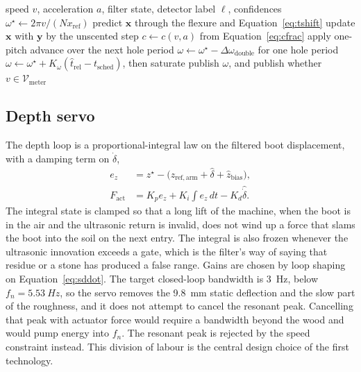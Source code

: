 \begin{algorithm}[ht]
\caption{Plate and feasibility update on one row}
\label{alg:plate}
\begin{algorithmic}[1]
\Require speed \(v\), acceleration \(a\), filter state, detector label \(\ell\), confidences
\State \(\omega^{\star} \gets 2\pi v / (N x_{\mathrm{ref}})\)
\State predict \(\mathbf{x}\) through the flexure and Equation~\eqref{eq:tshift}
\State update \(\mathbf{x}\) with \(\mathbf{y}\) by the unscented step
\State \(c \gets c(v,a)\) from Equation~\eqref{eq:cfrac}
  \State apply one-pitch advance over the next hole period
  \State \(\omega \gets \omega^{\star} - \Delta\omega_{\mathrm{double}}\) for one hole period
\Else
  \State \(\omega \gets \omega^{\star} + K_{\omega}(\hat{t}_{\mathrm{rel}}-t_{\mathrm{sched}})\), then saturate
\EndIf
\State publish \(\omega\), and publish whether \(v\in\mathcal{V}_{\mathrm{meter}}\)
\end{algorithmic}
\end{algorithm}

\subsection{Depth servo}

The depth loop is a proportional-integral law on the filtered boot displacement, with a damping term on \(\dot{\delta}\),
\begin{equation}
\label{eq:depth}
\begin{aligned}
e_z &= z^{\star} - \bigl(z_{\mathrm{ref,arm}} + \hat{\delta} + \hat{z}_{\mathrm{bias}}\bigr),\\
F_{\mathrm{act}} &= K_p e_z + K_i \int e_z\,dt - K_d \hat{\dot{\delta}}.
\end{aligned}
\end{equation}
The integral state is clamped so that a long lift of the machine, when the boot is in the air and the ultrasonic return is invalid, does not wind up a force that slams the boot into the soil on the next entry. The integral is also frozen whenever the ultrasonic innovation exceeds a gate, which is the filter's way of saying that residue or a stone has produced a false range. Gains are chosen by loop shaping on Equation~\eqref{eq:sddot}. The target closed-loop bandwidth is \SI{3}{Hz}, below \(f_n=\SI{5.53}{Hz}\), so the servo removes the \SI{9.8}{mm} static deflection and the slow part of the roughness, and it does not attempt to cancel the resonant peak. Cancelling that peak with actuator force would require a bandwidth beyond the wood and would pump energy into \(f_n\). The resonant peak is rejected by the speed constraint instead. This division of labour is the central design choice of the first technology.

